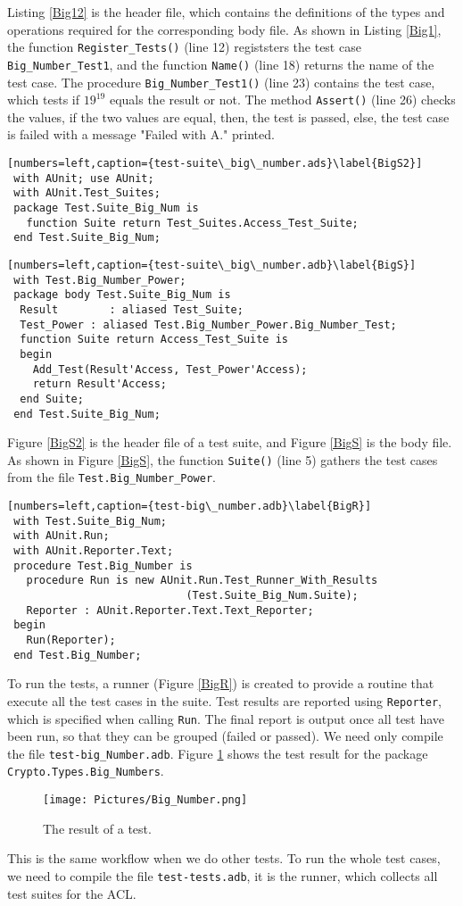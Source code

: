 Listing \ref{Big12} is the header file, which contains the definitions of the types and operations required for the corresponding body file. As shown in Listing \ref{Big1}, the function \texttt{Register\_Tests()} (line 12) registsters the test case \texttt{Big\_Number\_Test1}, and the function \texttt{Name()} (line 18) returns the name of the test case. The procedure \texttt{Big\_Number\_Test1()} (line 23) contains the test case, which tests if $19^{19}$ equals the result or not. The method \texttt{Assert()} (line 26) checks the values, if the two values are equal, then, the test is passed, else, the test case is failed with a message "Failed with A." printed. 

\begin{lstlisting}[numbers=left,caption={test-suite\_big\_number.ads}\label{BigS2}]
 with AUnit; use AUnit;
 with AUnit.Test_Suites;
 package Test.Suite_Big_Num is
   function Suite return Test_Suites.Access_Test_Suite;
 end Test.Suite_Big_Num;
\end{lstlisting}

\begin{lstlisting}[numbers=left,caption={test-suite\_big\_number.adb}\label{BigS}]
 with Test.Big_Number_Power;
 package body Test.Suite_Big_Num is
  Result	    : aliased Test_Suite;
  Test_Power : aliased Test.Big_Number_Power.Big_Number_Test;  
  function Suite return Access_Test_Suite is
  begin
    Add_Test(Result'Access, Test_Power'Access);    
    return Result'Access;
  end Suite;
 end Test.Suite_Big_Num;
\end{lstlisting}

Figure \ref{BigS2} is the header file of a test suite, and
Figure \ref{BigS} is the body file. As shown in Figure \ref{BigS}, the function \texttt{Suite()} (line 5) gathers the test cases from the file \texttt{Test.Big\_Number\_Power}.

\begin{lstlisting}[numbers=left,caption={test-big\_number.adb}\label{BigR}]
 with Test.Suite_Big_Num;
 with AUnit.Run;
 with AUnit.Reporter.Text;
 procedure Test.Big_Number is
   procedure Run is new AUnit.Run.Test_Runner_With_Results
   							(Test.Suite_Big_Num.Suite);
   Reporter : AUnit.Reporter.Text.Text_Reporter;
 begin
   Run(Reporter); 
 end Test.Big_Number;
\end{lstlisting}

To run the tests, a runner (Figure \ref{BigR}) is created to provide a routine that execute all the test cases in the suite. Test results are reported using \texttt{Reporter}, which is specified when calling \texttt{Run}. The final report is output once all test have been run, so that they can be grouped (failed or passed).
We need only compile the file \texttt{test-big\_Number.adb}.
Figure \ref{TEST} shows the test result for the package \texttt{Crypto.Types.Big\_Numbers}.
\begin{figure}[h]
\centering
  \texttt{[image: Pictures/Big\_Number.png]} 
  \caption{The result of a test.}\label{TEST}
\end{figure}

This is the same workflow when we do other tests. To run the whole test cases, we need to compile the file \texttt{test-tests.adb}, it is the runner, which collects all test suites for the ACL.